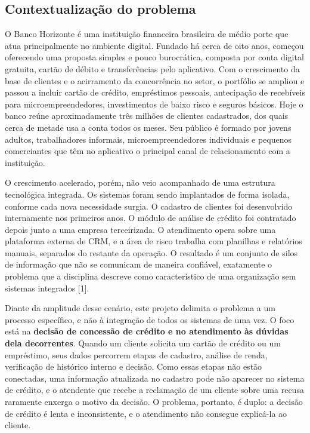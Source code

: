 \documentclass[12pt,a4paper]{article}
\begin{document}
\subsection{Contextualiza\c{c}\~ao do problema}

O Banco Horizonte \'e uma institui\c{c}\~ao financeira brasileira de m\'edio porte que atua principalmente no ambiente digital. Fundado h\'a cerca de oito anos, come\c{c}ou oferecendo uma proposta simples e pouco burocr\'atica, composta por conta digital gratuita, cart\~ao de d\'ebito e transfer\^encias pelo aplicativo. Com o crescimento da base de clientes e o acirramento da concorr\^encia no setor, o portf\'olio se ampliou e passou a incluir cart\~ao de cr\'edito, empr\'estimos pessoais, antecipa\c{c}\~ao de receb\'iveis para microempreendedores, investimentos de baixo risco e seguros b\'asicos. Hoje o banco re\'une aproximadamente tr\^es milh\~oes de clientes cadastrados, dos quais cerca de metade usa a conta todos os meses. Seu p\'ublico \'e formado por jovens adultos, trabalhadores informais, microempreendedores individuais e pequenos comerciantes que t\^em no aplicativo o principal canal de relacionamento com a institui\c{c}\~ao.

O crescimento acelerado, por\'em, n\~ao veio acompanhado de uma estrutura tecnol\'ogica integrada. Os sistemas foram sendo implantados de forma isolada, conforme cada nova necessidade surgia. O cadastro de clientes foi desenvolvido internamente nos primeiros anos. O m\'odulo de an\'alise de cr\'edito foi contratado depois junto a uma empresa terceirizada. O atendimento opera sobre uma plataforma externa de CRM, e a \'area de risco trabalha com planilhas e relat\'orios manuais, separados do restante da opera\c{c}\~ao. O resultado \'e um conjunto de silos de informa\c{c}\~ao que n\~ao se comunicam de maneira confi\'avel, exatamente o problema que a disciplina descreve como caracter\'istico de uma organiza\c{c}\~ao sem sistemas integrados [1].

Diante da amplitude desse cen\'ario, este projeto delimita o problema a um processo espec\'ifico, e n\~ao \`a integra\c{c}\~ao de todos os sistemas de uma vez. O foco est\'a na \textbf{decis\~ao de concess\~ao de cr\'edito e no atendimento \`as d\'uvidas dela decorrentes}. Quando um cliente solicita um cart\~ao de cr\'edito ou um empr\'estimo, seus dados percorrem etapas de cadastro, an\'alise de renda, verifica\c{c}\~ao de hist\'orico interno e decis\~ao. Como essas etapas n\~ao est\~ao conectadas, uma informa\c{c}\~ao atualizada no cadastro pode n\~ao aparecer no sistema de cr\'edito, e o atendente que recebe a reclama\c{c}\~ao de um cliente sobre uma recusa raramente enxerga o motivo da decis\~ao. O problema, portanto, \'e duplo: a decis\~ao de cr\'edito \'e lenta e inconsistente, e o atendimento n\~ao consegue explic\'a-la ao cliente.
\end{document}
